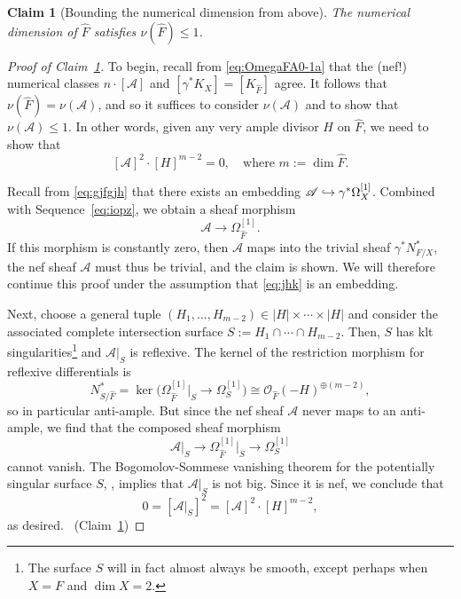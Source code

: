 \documentclass[JEP,XML,SOM,Unicode,published]{cedram}
\let\scr\mathscr
\newcommand\hto{\mathrel{\lhook\joinrel\to}}
\let\ra\rightarrow
\theoremstyle{plain}
\newtheorem{claim}[thm]{Claim}
\theoremstyle{definition}
\numberwithin{equation}{thm}
\numberwithin{enumi}{thm}
\newcommand{\sA}{\scr{A}}
\newcommand{\sO}{\scr{O}}
\let\what\widehat
\begin{document}
\begin{claim}[Bounding the numerical dimension from above]\label{claim:numericaldimensionbound-x}
The numerical dimen\-sion of $\what{F}$ satisfies $\nu(\what{F}) \leq 1$.
\end{claim}
\begin{proof}[Proof of Claim~\ref{claim:numericaldimensionbound-x}]
To begin, recall from \eqref{eq:OmegaFA0-1a} that the (nef!) numerical classes
$n\cdot [\sA]$ and $[\gamma^* K_X] = [K_{\what{F}}]$ agree. It follows that
$\nu(\what{F}) = \nu(\sA)$, and so it suffices to consider $\nu(\sA)$ and to show that
$\nu(\sA) \leq 1$. In other words, given any very ample divisor $H$ on $\what{F}$,
we need to show that
\begin{equation}\label{eq:xxl}
[\sA]^2\cdot [H]^{m-2} = 0, \quad \text{where } m := \dim \what{F}.
\end{equation}

Recall from \eqref{eq:gjfgjh} that there exists an embedding
$\sA \hto \gamma^* \Omega^{[1]}_X$. Combined with Sequence~\eqref{eq:iopz}, we obtain a
sheaf morphism
\begin{equation}\label{eq:jhk}
\sA \to \Omega^{[1]}_{\what{F}}.
\end{equation}
If this morphism is constantly zero, then $\sA$ maps into the trivial sheaf
$\gamma^* N^*_{F/X}$, the nef sheaf $\sA$ must thus be trivial, and the claim is
shown. We will therefore continue this proof under the assumption that
\eqref{eq:jhk} is an embedding.

Next, choose a general tuple $(H_1, \dots, H_{m-2}) \in |H| \times \cdots \times |H|$ and consider
the associated complete intersection surface $S := H_1 \cap\cdots\cap H_{m-2}$. Then,
$S$ has klt singularities\footnote{The surface $S$ will in fact almost always be smooth, except perhaps when $X\!=\!F$ and \hbox{$\dim X\!=\!2$}.} and $\sA|_S$ is
reflexive. The kernel of the restriction morphism for reflexive differentials
is
\[
N_{S/\what{F}}^* = \ker \bigl(\Omega^{[1]}_{\what{F}}\bigr|_S \ra \Omega^{[1]}_S \bigr)
\cong \sO_{\what{F}}(-H)^{\oplus(m-2)},
\]
so in particular anti-ample. But since the nef sheaf $\sA$ never maps to an
anti-ample, we find that the composed sheaf morphism
\[
\sA|_S \to \Omega^{[1]}_{\what{F}} \Bigr|_S \to \Omega_S^{[1]}
\]
cannot vanish. The Bogomolov-Sommese vanishing theorem for the potentially
singular surface $S$, \cite[Th.\,8.3]{GKK08}, implies that $\sA|_S$ is not big.
Since it is nef, we conclude that
\[
0 = [\sA|_S]^2 = [\sA]^2\cdot [H]^{m-2},
\]
as desired. \qedhere~\mbox{(Claim~\ref{claim:numericaldimensionbound-x})}
\end{proof}
\end{document}
